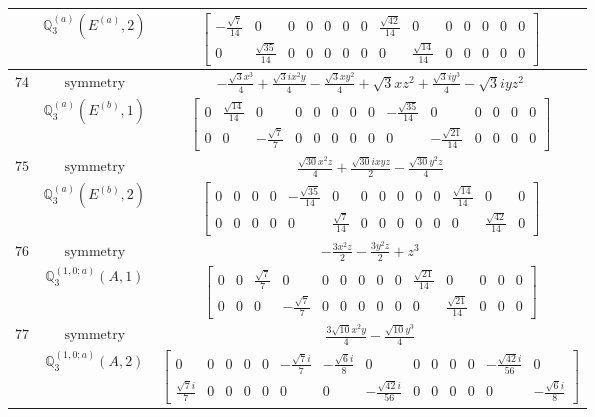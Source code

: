 \documentclass[fleqn,8pt,landscape]{jsarticle}
\begin{document}
\begin{longtable}{ccc}
$  $ & $ \mathbb{Q}_{3}^{(a)}(E^{(a)},2) $ & $ \begin{bmatrix} - \frac{\sqrt{7}}{14} & 0 & 0 & 0 & 0 & 0 & 0 & \frac{\sqrt{42}}{14} & 0 & 0 & 0 & 0 & 0 & 0 \\ 0 & \frac{\sqrt{35}}{14} & 0 & 0 & 0 & 0 & 0 & 0 & \frac{\sqrt{14}}{14} & 0 & 0 & 0 & 0 & 0 \end{bmatrix} $ \\ \hline
$ 74 $ & $ \text{symmetry} $ & $ - \frac{\sqrt{3} x^{3}}{4} + \frac{\sqrt{3} i x^{2} y}{4} - \frac{\sqrt{3} x y^{2}}{4} + \sqrt{3} x z^{2} + \frac{\sqrt{3} i y^{3}}{4} - \sqrt{3} i y z^{2} $ \\
$  $ & $ \mathbb{Q}_{3}^{(a)}(E^{(b)},1) $ & $ \begin{bmatrix} 0 & \frac{\sqrt{14}}{14} & 0 & 0 & 0 & 0 & 0 & 0 & - \frac{\sqrt{35}}{14} & 0 & 0 & 0 & 0 & 0 \\ 0 & 0 & - \frac{\sqrt{7}}{7} & 0 & 0 & 0 & 0 & 0 & 0 & - \frac{\sqrt{21}}{14} & 0 & 0 & 0 & 0 \end{bmatrix} $ \\ \hline
$ 75 $ & $ \text{symmetry} $ & $ \frac{\sqrt{30} x^{2} z}{4} + \frac{\sqrt{30} i x y z}{2} - \frac{\sqrt{30} y^{2} z}{4} $ \\
$  $ & $ \mathbb{Q}_{3}^{(a)}(E^{(b)},2) $ & $ \begin{bmatrix} 0 & 0 & 0 & 0 & - \frac{\sqrt{35}}{14} & 0 & 0 & 0 & 0 & 0 & 0 & \frac{\sqrt{14}}{14} & 0 & 0 \\ 0 & 0 & 0 & 0 & 0 & \frac{\sqrt{7}}{14} & 0 & 0 & 0 & 0 & 0 & 0 & \frac{\sqrt{42}}{14} & 0 \end{bmatrix} $ \\ \hline
$ 76 $ & $ \text{symmetry} $ & $ - \frac{3 x^{2} z}{2} - \frac{3 y^{2} z}{2} + z^{3} $ \\
$  $ & $ \mathbb{Q}_{3}^{(1,0;a)}(A,1) $ & $ \begin{bmatrix} 0 & 0 & \frac{\sqrt{7}}{7} & 0 & 0 & 0 & 0 & 0 & 0 & \frac{\sqrt{21}}{14} & 0 & 0 & 0 & 0 \\ 0 & 0 & 0 & - \frac{\sqrt{7}}{7} & 0 & 0 & 0 & 0 & 0 & 0 & \frac{\sqrt{21}}{14} & 0 & 0 & 0 \end{bmatrix} $ \\ \hline
$ 77 $ & $ \text{symmetry} $ & $ \frac{3 \sqrt{10} x^{2} y}{4} - \frac{\sqrt{10} y^{3}}{4} $ \\
$  $ & $ \mathbb{Q}_{3}^{(1,0;a)}(A,2) $ & $ \begin{bmatrix} 0 & 0 & 0 & 0 & 0 & - \frac{\sqrt{7} i}{7} & - \frac{\sqrt{6} i}{8} & 0 & 0 & 0 & 0 & 0 & - \frac{\sqrt{42} i}{56} & 0 \\ \frac{\sqrt{7} i}{7} & 0 & 0 & 0 & 0 & 0 & 0 & - \frac{\sqrt{42} i}{56} & 0 & 0 & 0 & 0 & 0 & - \frac{\sqrt{6} i}{8} \end{bmatrix} $ \\ \hline

\end{longtable}
\end{document}

